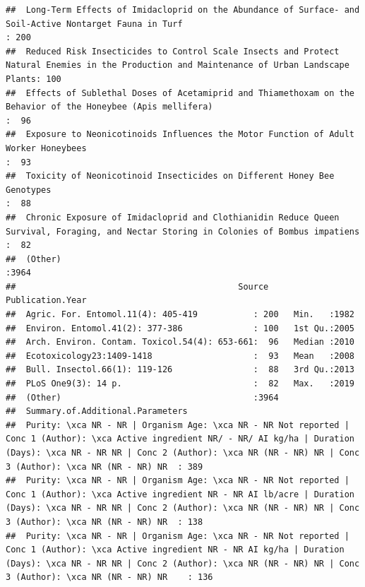 \documentclass[]{article}
\begin{document}
\begin{verbatim}
##  Long-Term Effects of Imidacloprid on the Abundance of Surface- and Soil-Active Nontarget Fauna in Turf                                    : 200  
##  Reduced Risk Insecticides to Control Scale Insects and Protect Natural Enemies in the Production and Maintenance of Urban Landscape Plants: 100  
##  Effects of Sublethal Doses of Acetamiprid and Thiamethoxam on the Behavior of the Honeybee (Apis mellifera)                               :  96  
##  Exposure to Neonicotinoids Influences the Motor Function of Adult Worker Honeybees                                                        :  93  
##  Toxicity of Neonicotinoid Insecticides on Different Honey Bee Genotypes                                                                   :  88  
##  Chronic Exposure of Imidacloprid and Clothianidin Reduce Queen Survival, Foraging, and Nectar Storing in Colonies of Bombus impatiens     :  82  
##  (Other)                                                                                                                                   :3964  
##                                            Source     Publication.Year
##  Agric. For. Entomol.11(4): 405-419           : 200   Min.   :1982    
##  Environ. Entomol.41(2): 377-386              : 100   1st Qu.:2005    
##  Arch. Environ. Contam. Toxicol.54(4): 653-661:  96   Median :2010    
##  Ecotoxicology23:1409-1418                    :  93   Mean   :2008    
##  Bull. Insectol.66(1): 119-126                :  88   3rd Qu.:2013    
##  PLoS One9(3): 14 p.                          :  82   Max.   :2019    
##  (Other)                                      :3964                   
##  Summary.of.Additional.Parameters                                                                                                                                                                                                                       
##  Purity: \xca NR - NR | Organism Age: \xca NR - NR Not reported | Conc 1 (Author): \xca Active ingredient NR/ - NR/ AI kg/ha | Duration (Days): \xca NR - NR NR | Conc 2 (Author): \xca NR (NR - NR) NR | Conc 3 (Author): \xca NR (NR - NR) NR  : 389  
##  Purity: \xca NR - NR | Organism Age: \xca NR - NR Not reported | Conc 1 (Author): \xca Active ingredient NR - NR AI lb/acre | Duration (Days): \xca NR - NR NR | Conc 2 (Author): \xca NR (NR - NR) NR | Conc 3 (Author): \xca NR (NR - NR) NR  : 138  
##  Purity: \xca NR - NR | Organism Age: \xca NR - NR Not reported | Conc 1 (Author): \xca Active ingredient NR - NR AI kg/ha | Duration (Days): \xca NR - NR NR | Conc 2 (Author): \xca NR (NR - NR) NR | Conc 3 (Author): \xca NR (NR - NR) NR    : 136  

\end{verbatim}
\end{document}
